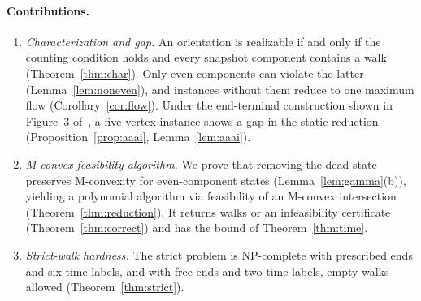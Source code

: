 \paragraph{Contributions.}
\begin{enumerate}
\item \emph{Characterization and gap.} An orientation is realizable if and only if the counting condition holds and every snapshot component contains a walk (Theorem~\ref{thm:char}). Only even components can violate the latter (Lemma~\ref{lem:noneven}), and instances without them reduce to one maximum flow (Corollary~\ref{cor:flow}). Under the end-terminal construction shown in Figure~3 of~\cite{deligkas2025}, a five-vertex instance shows a gap in the static reduction (Proposition~\ref{prop:aaai}, Lemma~\ref{lem:aaai}).
\item \emph{M-convex feasibility algorithm.} We prove that removing the dead state preserves M-convexity for even-component states (Lemma~\ref{lem:gamma}(b)), yielding a polynomial algorithm via feasibility of an M-convex intersection (Theorem~\ref{thm:reduction}). It returns walks or an infeasibility certificate (Theorem~\ref{thm:correct}) and has the bound of Theorem~\ref{thm:time}.
\item \emph{Strict-walk hardness.} The strict problem is NP-complete with prescribed ends and six time labels, and with free ends and two time labels, empty walks allowed (Theorem~\ref{thm:strict}).
\end{enumerate}
